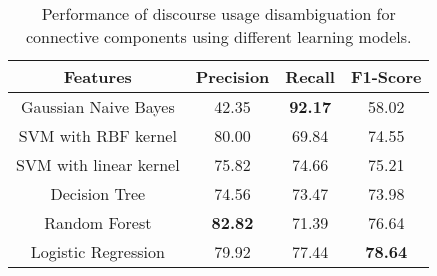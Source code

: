 \begin{table}[ht]
\centering
\begin{tabular}{|c|c|c|c|}
\hline

\bf Features               & \bf Precision & \bf Recall & \bf F1-Score \\ \hline
    Gaussian Naive Bayes   &     42.35     & \bf 92.17  &     58.02    \\ \hline
    SVM with RBF kernel    &     80.00     &     69.84  &     74.55    \\ \hline
    SVM with linear kernel &     75.82     &     74.66  &     75.21    \\ \hline
    Decision Tree          &     74.56     &     73.47  &     73.98    \\ \hline
    Random Forest          & \bf 82.82     &     71.39  &     76.64    \\ \hline
    Logistic Regression    &     79.92     &     77.44  & \bf 78.64    \\ \hline

\end{tabular}
\caption{\label{t:recognition-models} Performance of discourse usage
disambiguation for connective components using different learning models. }
\end{table}
